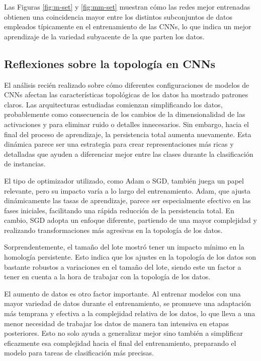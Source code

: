 Las Figuras \ref{fig:m-set} y \ref{fig:mm-set} muestran cómo las redes mejor entrenadas
obtienen una coincidencia mayor entre los distintos subconjuntos de datos empleados
típicamente en el entrenamiento de las CNNs, lo que indica un mejor aprendizaje
de la variedad subyacente de la que parten los datos.

\subsection{Reflexiones sobre la topología en CNNs}

El análisis recién realizado sobre cómo diferentes configuraciones de modelos de
CNNs afectan las características topológicas de los datos ha mostrado patrones claros.
Las arquitecturas estudiadas comienzan simplificando los datos, probablemente como
consecuencia de los cambios de la dimensionalidad de las activaciones y para eliminar
ruido o detalles innecesarios. Sin embargo, hacia el final del proceso de aprendizaje,
la persistencia total aumenta nuevamente. Esta dinámica parece ser una estrategia
para crear representaciones más ricas y detalladas que ayuden a diferenciar mejor
entre las clases durante la clasificación de instancias.

El tipo de optimizador utilizado, como Adam o SGD, también juega un papel relevante,
pero su impacto varía a lo largo del entrenamiento. Adam, que ajusta
dinámicamente las tasas de aprendizaje, parece ser especialmente efectivo en las
fases iniciales, facilitando una rápida reducción de la persistencia total. En cambio,
SGD adopta un enfoque diferente, partiendo de una mayor complejidad y realizando
transformaciones más agresivas en la topología de los datos.

Sorprendentemente, el tamaño del lote mostró tener un impacto mínimo en la
homología persistente. Esto indica que los ajustes en la topología de los datos son
bastante robustos a variaciones en el tamaño del lote, siendo este un factor a
tener en cuenta a la hora de trabajar con la topología de los datos.

El aumento de datos es otro factor importante. Al entrenar modelos con una mayor
variedad de datos durante el entrenamiento, se promueve una adaptación más
temprana y efectiva a la complejidad relativa de los datos, lo que lleva a una menor
necesidad de trabajar los datos de manera tan intensiva en etapas posteriores.
Esto no solo ayuda a generalizar mejor sino también a simplificar eficazmente
esa complejidad hacia el final del entrenamiento, preparando el modelo para tareas
de clasificación más precisas.

